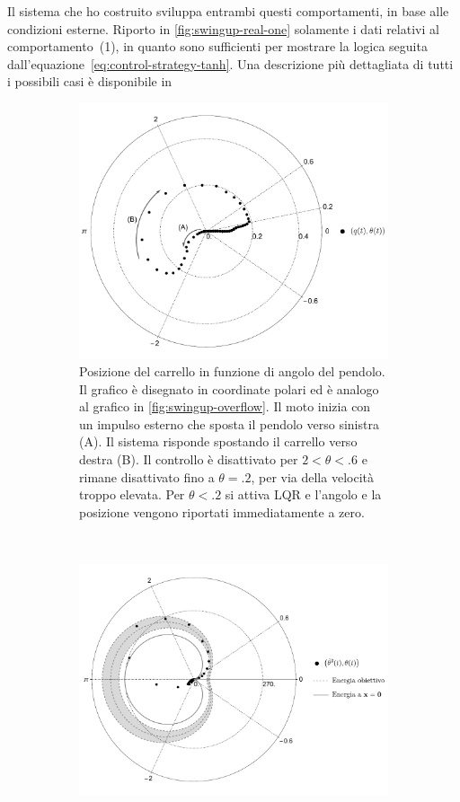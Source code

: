 Il sistema che ho costruito sviluppa entrambi questi comportamenti,
in base alle condizioni esterne\footnotemark .
Riporto in \autoref{fig:swingup-real-one} solamente i dati relativi al comportamento~(1), in quanto sono
sufficienti per mostrare la logica seguita dall'equazione~\eqref{eq:control-strategy-tanh}.
Una descrizione più dettagliata di tutti i possibili casi è disponibile in


\begin{figure}
    \centering
    \begin{subfigure}[]{\textwidth}
        \centering
        \includegraphics[width=.6\textwidth]{assets/polar-swingup-real}
        \caption{Posizione del carrello in funzione di angolo del pendolo.
        Il grafico è disegnato in coordinate polari ed è analogo
        al grafico in \autoref{fig:swingup-overflow}.
        Il moto inizia con un impulso esterno che sposta il pendolo
        verso sinistra (A). Il sistema risponde spostando il carrello verso
        destra (B). Il controllo è disattivato per $2 < \theta < .6$
        e rimane disattivato fino a $\theta = .2$, per via della velocità troppo
        elevata. Per $\theta < .2$ si attiva LQR e l'angolo e la posizione
        vengono riportati immediatamente a zero.
        }
        \label{fig:spazio-fasi-sistema-polare}
    \end{subfigure}
    \\[4ex]
    \begin{subfigure}[]{\textwidth}
        \centering
        \includegraphics[width=.7\textwidth]{assets/polar-swingup-energy}


\end{subfigure}
\end{figure}

